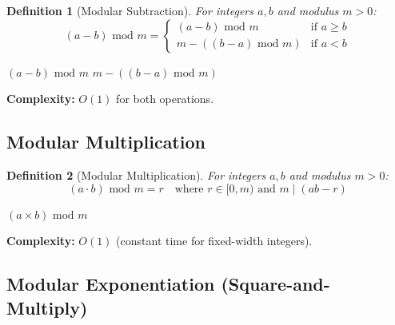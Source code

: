 \documentclass[11pt,a4paper]{article}
\newtheorem{definition}{Definition}
\newcommand{\bmod}{\text{ mod }}
\begin{document}
\begin{definition}[Modular Subtraction]
For integers $a, b$ and modulus $m > 0$:
\[
(a - b) \bmod m = 
\begin{cases}
(a - b) \bmod m & \text{if } a \geq b \\
m - ((b - a) \bmod m) & \text{if } a < b
\end{cases}
\]
\end{definition}

\begin{algorithm}[H]
\caption{Modular Subtraction}
\begin{algorithmic}[1]
        \State \Return $(a - b) \bmod m$
    \Else
        \State \Return $m - ((b - a) \bmod m)$
    \EndIf
\EndFunction
\end{algorithmic}
\end{algorithm}

\textbf{Complexity:} $O(1)$ for both operations.

\subsection{Modular Multiplication}

\begin{definition}[Modular Multiplication]
For integers $a, b$ and modulus $m > 0$:
\[
(a \cdot b) \bmod m = r \quad \text{where } r \in [0, m) \text{ and } m \mid (ab - r)
\]
\end{definition}

\begin{algorithm}[H]
\caption{Modular Multiplication}
\begin{algorithmic}[1]
    \State \Return $(a \times b) \bmod m$
\EndFunction
\end{algorithmic}
\end{algorithm}

\textbf{Complexity:} $O(1)$ (constant time for fixed-width integers).

\subsection{Modular Exponentiation (Square-and-Multiply)}
\end{document}
